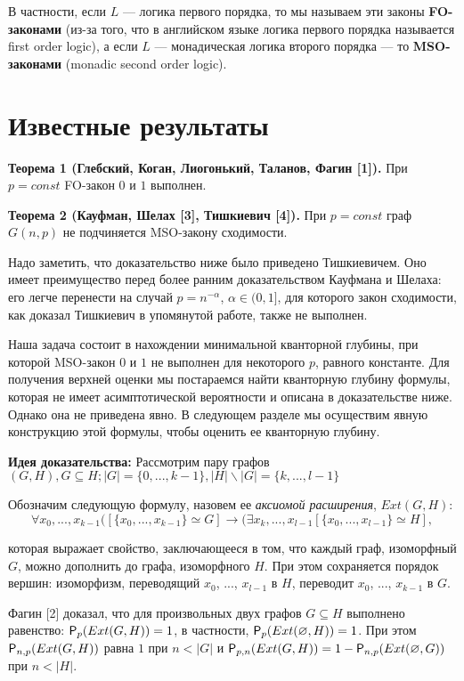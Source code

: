 \documentclass{article}
\begin{document}
В частности, если $L$ --- логика первого порядка, то мы называем эти законы {\bf FO-законами} (из-за того, что в английском языке логика первого порядка называется first order logic), а если $L$ --- монадическая логика второго порядка --- то {\bf MSO-законами} (monadic second order logic).

\section{Известные результаты}

{\bf Теорема 1 (Глебский, Коган, Лиогонький, Таланов, Фагин [1]).} При $p = const$ FO-закон $0$ и $1$ выполнен.

{\bf Теорема 2 (Кауфман, Шелах [3], Тишкиевич [4]).} При $p = const$ граф $G(n, p)$ не подчиняется MSO-закону сходимости.

Надо заметить, что доказательство ниже было приведено Тишкиевичем. Оно имеет преимущество перед более ранним доказательством Кауфмана и Шелаха: его легче перенести на случай $p = n^{-\alpha}$, $\alpha\in(0,1]$, для которого закон сходимости, как доказал Тишкиевич в упомянутой работе, также не выполнен.

Наша задача состоит в нахождении минимальной кванторной глубины, при которой MSO-закон $0$ и $1$ не выполнен для некоторого $p$, равного константе. Для получения верхней оценки мы постараемся найти кванторную глубину формулы, которая не имеет асимптотической вероятности и описана в доказательстве ниже. Однако она не приведена явно. В следующем разделе мы осуществим явную конструкцию этой формулы, чтобы оценить ее кванторную глубину.

{\bf Идея доказательства:} Рассмотрим пару графов $(G, H), G \subseteq H; |G| = \{ 0, ..., k-1\}, |H| \backslash |G| = \{k, ..., l-1\}$

Обозначим следующую формулу, назовем ее \textit{аксиомой расширения}, $Ext(G,H)$:
$$\forall x_0, ..., x_{k-1} ([\{x_0, ..., x_{k-1}\} \simeq G]  \to (\exists x_k, ..., x_{l-1} [\{x_0, ..., x_{l-1}\} \simeq H],$$

которая выражает свойство, заключающееся в том, что каждый граф, изоморфный $G$, можно дополнить до графа, изоморфного $H$. При этом сохраняется порядок вершин: изоморфизм, переводящий $x_0$, ..., $x_{l-1}$ в $H$, переводит $x_0$, ..., $x_{k-1}$ в $G$.

Фагин [2] доказал, что для произвольных двух графов $G \subseteq H$ выполнено равенство: ${\sf P}_{p}(Ext(G, H)) = 1$, в частности, ${\sf P}_{p}(Ext(\varnothing, H)) =1$. При этом ${\sf P}_{n, p}(Ext(G,H))$ равна $1$ при $n < |G|$ и ${\sf P}_{p, n}(Ext(G, H)) = 1 - {\sf P}_{n, p}(Ext(\varnothing, G))$ при $ n < |H|$.
\end{document}
